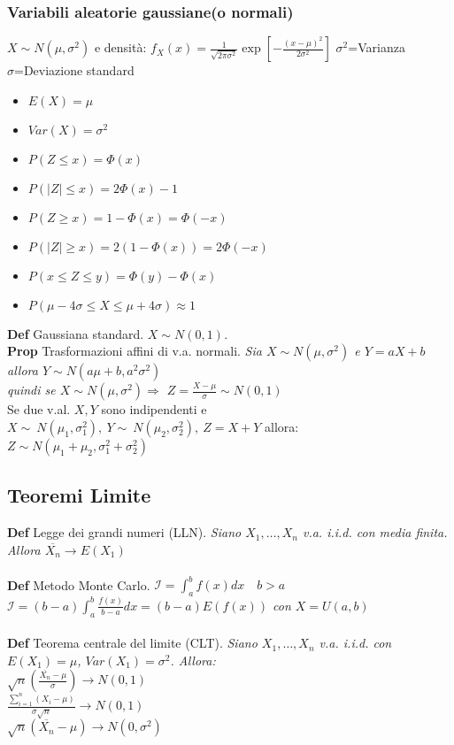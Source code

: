 \documentclass[10pt,a4paper]{article}
\begin{document}
\begin{multicols}{2}
\subsubsection*{Variabili aleatorie gaussiane(o normali)}
    $X \sim N(\mu, \sigma^2)$ e densità:
    $f_X(x) = \frac{1}{\sqrt{2\pi\sigma^2}} \exp\left[-\frac{(x-\mu)^2}{2\sigma^2}\right]$
    $\sigma^2$=Varianza\\
    $\sigma$=Deviazione standard\\
    \begin{itemize}
    \item $E(X) = \mu$
    \item $Var(X) = \sigma^2$
    \item $P(Z \leq x) = \Phi(x)$
    \item $P(|Z| \leq x) = 2\Phi(x)-1$
    \item $P(Z \geq x) = 1-\Phi(x) = \Phi(-x)$
    \item $P(|Z| \geq x) = 2(1-\Phi(x))=2\Phi(-x)$
    \item $P(x \le Z \le y) = \Phi(y)-\Phi(x)$
    \item $P(\mu - 4\sigma \leq X \leq \mu + 4\sigma) \approx 1$
    \end{itemize}    
\textbf{Def} Gaussiana standard. \textit{ 
    $X \sim N(0,1)$.
}\\
\textbf{Prop} Trasformazioni affini di v.a. normali. \textit{
    Sia $X \sim N(\mu, \sigma^2)$ e $Y=aX+b$ allora
    $Y \sim N(a\mu+b, a^2\sigma^2)$\\
    quindi se $X \sim N(\mu, \sigma^2) \Rightarrow$
    $Z = \frac{X-\mu}{\sigma} \sim N(0, 1)$
}\\
Se due v.al. $X,Y$ sono indipendenti e $X \sim ~N(\mu_1, \sigma_1^2), \ Y \sim ~N(\mu_2, \sigma_2^2), \ Z=X+Y$ allora:\\
$Z \sim N(\mu_1 + \mu_2, \sigma_1^2 + \sigma_2^2)$

\subsection*{Teoremi Limite}

\textbf{Def} Legge dei grandi numeri (LLN). \textit{
Siano $X_1, \dots, X_n$ v.a. i.i.d. con media finita. Allora
$\overline{X_n} \to E(X_1)$
}\\\\
\textbf{Def} Metodo Monte Carlo. \textit{
$\mathcal{I} = \int^b_a f(x)dx \quad b>a$\\
$\mathcal{I} = (b-a)\int^b_a\frac{f(x)}{b-a} dx = (b-a)E(f(x))$
con $X = U(a, b)$
}\\\\
\textbf{Def} Teorema centrale del limite (CLT). \textit{
Siano $X_1, \dots, X_n$ v.a. i.i.d. con $E(X_1) = \mu$, $Var(X_1) = \sigma^2$. Allora:\\
  $\sqrt{n} \left( \frac{\overline{X_n}-\mu}{\sigma} \right) \to N(0,1)$ \\
  $\frac{\sum\limits_{i=1}^n (X_i - \mu)}{\sigma\sqrt{n}} \to N(0,1)$ \\
  $\sqrt{n}(\overline{X_n}-\mu) \to N(0,\sigma^2)$
}


\end{multicols}
\end{document}
